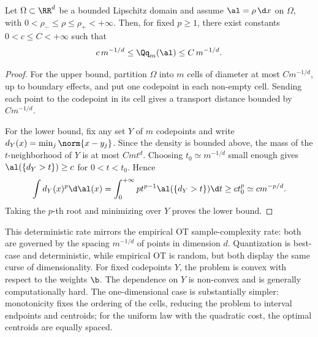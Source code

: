 \begin{prop}\label{prop-quantization-rate}
	Let $\Omega\subset\RR^d$ be a bounded Lipschitz domain and assume $\al=\rho\,\d x$ on $\Omega$, with $0<\rho_-\leq\rho\leq\rho_+<+\infty$. Then, for fixed $p\geq1$, there exist constants $0<c\leq C<+\infty$ such that
	\[
		c\,m^{-1/d}
		\leq
		\Qq_m(\al)
		\leq
		C\,m^{-1/d}.
	\]
\end{prop}
\begin{proof}
	For the upper bound, partition $\Omega$ into $m$ cells of diameter at most $Cm^{-1/d}$, up to boundary effects, and put one codepoint in each non-empty cell. Sending each point to the codepoint in its cell gives a transport distance bounded by $Cm^{-1/d}$.

	For the lower bound, fix any set $Y$ of $m$ codepoints and write $d_Y(x)=\min_j\norm{x-y_j}$. Since the density is bounded above, the mass of the $t$-neighborhood of $Y$ is at most $Cmt^d$. Choosing $t_0\simeq m^{-1/d}$ small enough gives $\al(\{d_Y>t\})\geq c$ for $0<t<t_0$. Hence
	\[
		\int d_Y(x)^p\d\al(x)
		=
		\int_0^{+\infty} p t^{p-1}\al(\{d_Y>t\})\d t
		\geq
		c t_0^p
		\simeq
		c m^{-p/d}.
	\]
	Taking the $p$-th root and minimizing over $Y$ proves the lower bound.
\end{proof}

This deterministic rate mirrors the empirical OT sample-complexity rate: both are governed by the spacing $m^{-1/d}$ of points in dimension $d$. Quantization is best-case and deterministic, while empirical OT is random, but both display the same curse of dimensionality.
For fixed codepoints $Y$, the problem is convex with respect to the weights $\b$. The dependence on $Y$ is non-convex and is generally computationally hard. The one-dimensional case is substantially simpler: monotonicity fixes the ordering of the cells, reducing the problem to interval endpoints and centroids; for the uniform law with the quadratic cost, the optimal centroids are equally spaced.

